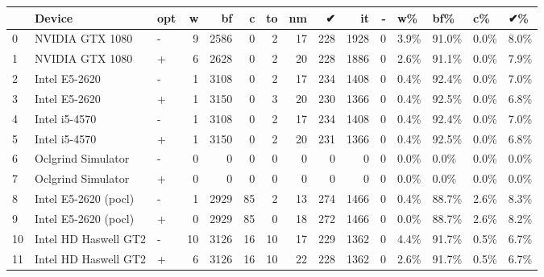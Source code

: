 \begin{tabular}{lllrrrrrrrrllll}
\toprule
{} &                Device & opt &   w &    bf &   c &  to &  nm &    ✔ &    it &  - &    w\% &    bf\% &    c\% &    ✔\% \\
\midrule
0  &       NVIDIA GTX 1080 &   - &   9 &  2586 &   0 &   2 &  17 &  228 &  1928 &  0 &  3.9\% &  91.0\% &  0.0\% &  8.0\% \\
1  &       NVIDIA GTX 1080 &   + &   6 &  2628 &   0 &   2 &  20 &  228 &  1886 &  0 &  2.6\% &  91.1\% &  0.0\% &  7.9\% \\
2  &         Intel E5-2620 &   - &   1 &  3108 &   0 &   2 &  17 &  234 &  1408 &  0 &  0.4\% &  92.4\% &  0.0\% &  7.0\% \\
3  &         Intel E5-2620 &   + &   1 &  3150 &   0 &   3 &  20 &  230 &  1366 &  0 &  0.4\% &  92.5\% &  0.0\% &  6.8\% \\
4  &         Intel i5-4570 &   - &   1 &  3108 &   0 &   2 &  17 &  234 &  1408 &  0 &  0.4\% &  92.4\% &  0.0\% &  7.0\% \\
5  &         Intel i5-4570 &   + &   1 &  3150 &   0 &   2 &  20 &  231 &  1366 &  0 &  0.4\% &  92.5\% &  0.0\% &  6.8\% \\
6  &    Oclgrind Simulator &   - &   0 &     0 &   0 &   0 &   0 &    0 &     0 &  0 &  0.0\% &   0.0\% &  0.0\% &  0.0\% \\
7  &    Oclgrind Simulator &   + &   0 &     0 &   0 &   0 &   0 &    0 &     0 &  0 &  0.0\% &   0.0\% &  0.0\% &  0.0\% \\
8  &  Intel E5-2620 (pocl) &   - &   1 &  2929 &  85 &   2 &  13 &  274 &  1466 &  0 &  0.4\% &  88.7\% &  2.6\% &  8.3\% \\
9  &  Intel E5-2620 (pocl) &   + &   0 &  2929 &  85 &   0 &  18 &  272 &  1466 &  0 &  0.0\% &  88.7\% &  2.6\% &  8.2\% \\
10 &  Intel HD Haswell GT2 &   - &  10 &  3126 &  16 &  10 &  17 &  229 &  1362 &  0 &  4.4\% &  91.7\% &  0.5\% &  6.7\% \\
11 &  Intel HD Haswell GT2 &   + &   6 &  3126 &  16 &  10 &  22 &  228 &  1362 &  0 &  2.6\% &  91.7\% &  0.5\% &  6.7\% \\
\bottomrule
\end{tabular}
